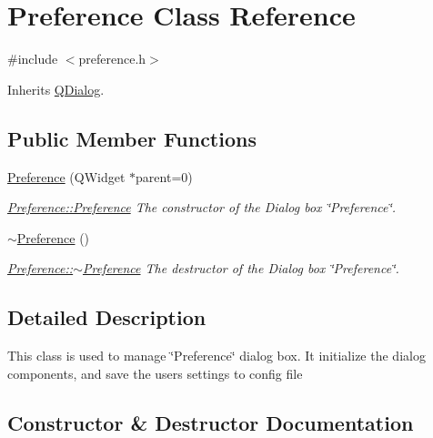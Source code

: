\hypertarget{class_preference}{}\section{Preference Class Reference}
\label{class_preference}


{\ttfamily \#include $<$preference.\+h$>$}



Inherits \hyperlink{class_q_dialog}{Q\+Dialog}.

\subsection*{Public Member Functions}
\begin{DoxyCompactItemize}
\item 
\hyperlink{class_preference_a6a80d4f65d8d74d3777c04854d9e8db3}{Preference} (Q\+Widget $\ast$parent=0)
\begin{DoxyCompactList}\small\item\em \hyperlink{class_preference_a6a80d4f65d8d74d3777c04854d9e8db3}{Preference\+::\+Preference} The constructor of the Dialog box \char`\"{}\+Preference\char`\"{}. \end{DoxyCompactList}\item 
\hyperlink{class_preference_ab7dc94871591bfcff6849c26b7638bba}{$\sim$\+Preference} ()
\begin{DoxyCompactList}\small\item\em \hyperlink{class_preference_ab7dc94871591bfcff6849c26b7638bba}{Preference\+::$\sim$\+Preference} The destructor of the Dialog box \char`\"{}\+Preference\char`\"{}. \end{DoxyCompactList}\end{DoxyCompactItemize}


\subsection{Detailed Description}
This class is used to manage \char`\"{}\+Preference\char`\"{} dialog box. It initialize the dialog components, and save the user\textquotesingle{}s settings to config file 

\subsection{Constructor \& Destructor Documentation}
